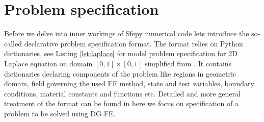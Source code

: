 \section{Problem specification}
Before we delve into inner workings of Sfepy numerical code lets introduce the so-called 
declarative problem specification format. The format relies on Python dictionaries, see 
Listing \ref{lst:laplace} for model problem specification for 2D Laplace equation on 
domain $[0, 1] \times [0, 1]$ simplified from . It 
contains dictionaries declaring components of the problem like regions in geometric 
domain, field governing the used FE method, state and test variables, boundary 
conditions, material constants and functions etc. Detailed and more general treatment of 
the format can be found in \cite{Cimrman_Lukes_Rohan_2019} here we focus on specification 
of a problem to be solved using DG FE.


